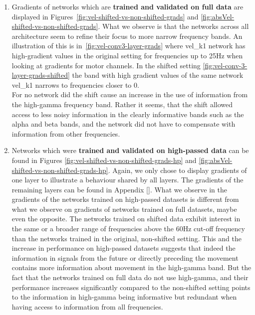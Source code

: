 \begin{enumerate}
    \item Gradients of networks which are \textbf{trained and validated on full data} are displayed in Figures~\ref{fig:vel-shifted-vs-non-shifted-grads} and \ref{fig:absVel-shifted-vs-non-shifted-grads}.
    What we observe is that the networks across all architecture seem to refine their focus to more narrow frequency bands.
    An illustration of this is in~\ref{fig:vel-conv3-layer-grads} where vel\_k1 network has high-gradient values in the original setting for frequencies up to 25Hz when looking at gradients for motor channels.
    In the shifted setting \ref{fig:vel-conv-3-layer-grads-shifted} the band with high gradient values of the same network vel\_k1 narrows to frequencies closer to 0. \\
    
    For no network  did the shift cause an increase in the use of information from the high-gamma frequency band.
    Rather it seems, that the shift allowed access to less noisy information in the clearly informative bands such as the alpha and beta bands, and the network did not have to compensate with information from other frequencies.
    \item Networks which were \textbf{trained and validated on high-passed data} can be found in Figures \ref{fig:vel-shifted-vs-non-shifted-grads-hp} and \ref{fig:absVel-shifted-vs-non-shifted-grads-hp}.
    Again, we only chose to display gradients of one layer to illustrate a behaviour shared by all layers. The gradients of the remaining layers can be found in Appendix \ref{}\todo.
    What we observe in the gradients of the networks trained on high-passed datasets is different from what we observe on gradients of networks trained on full datasets, maybe even the opposite.
    The networks trained on shifted data exhibit interest in the same or a broader range of frequencies above the 60Hz cut-off frequency than the networks trained in the original, non-shifted setting.
    This and the increase in performance on high-passed datasets suggests that indeed the information in signals from the future or directly preceding the movement contains more information about movement in the high-gamma band.
    But the fact that the networks trained on full data do not use high-gamma, and their performance increases significantly compared to the non-shifted setting points to the information in high-gamma being informative but redundant when having access to information from all frequencies.
\end{enumerate}

